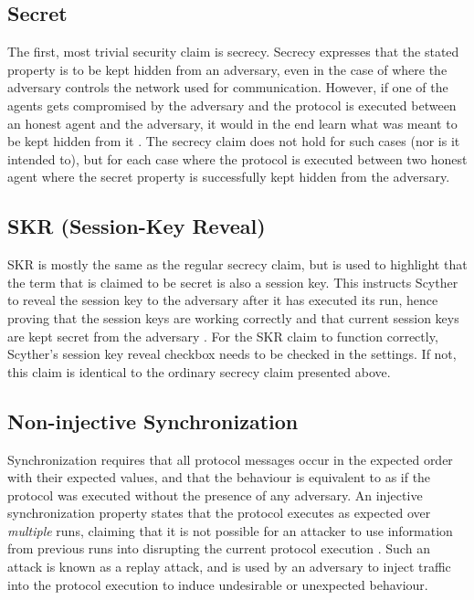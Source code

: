 \subsection{Secret}

The first, most trivial security claim is secrecy. Secrecy expresses that the stated property is to be kept hidden from an adversary, even in the case of where the adversary controls the network used for communication. However, if one of the agents gets compromised by the adversary and the protocol is executed between an honest agent and the adversary, it would in the end learn what was meant to be kept hidden from it \cite{cremers2005operational}. The secrecy claim does not hold for such cases (nor is it intended to), but for each case where the protocol is executed between two honest agent where the secret property is successfully kept hidden from the adversary. 

\subsection{SKR (Session-Key Reveal)}

SKR is mostly the same as the regular secrecy claim, but is used to highlight that the term that is claimed to be secret is also a session key. This instructs Scyther to reveal the session key to the adversary after it has executed its run, hence proving that the session keys are working correctly and that current session keys are kept secret from the adversary \cite{scyther-manual}. For the SKR claim to function correctly, Scyther's session key reveal checkbox needs to be checked in the settings. If not, this claim is identical to the ordinary secrecy claim presented above.


\subsection{Non-injective Synchronization}

Synchronization requires that all protocol messages occur in the expected order with their expected values, and that the behaviour is equivalent to as if the protocol was executed without the presence of any adversary. An injective synchronization property states that the protocol executes as expected over \emph{multiple} runs, claiming that it is not possible for an attacker to use information from previous runs into disrupting the current protocol execution \cite{cremers2005operational}. Such an attack is known as a replay attack, and is used by an adversary to inject traffic into the protocol execution to induce undesirable or unexpected behaviour.

